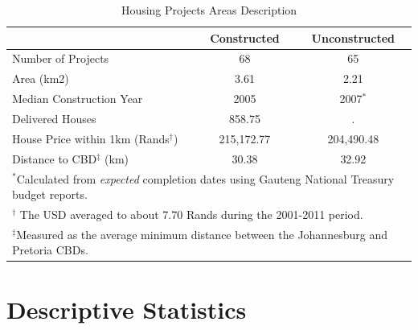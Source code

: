\documentclass[12pt]{article}
\begin{document}
\begin{table}[t!]
\centering
\caption{Housing Projects Areas Description}\label{table:projectdescriptives}
\vspace{-2mm}
\begin{tabular}{l*{1}{cc}}
\toprule
  &Constructed &Unconstructed \\
\midrule
Number of Projects  &       68 &       65 \\
Area (km2) &       3.61 &       2.21  \\
Median Construction Year & 2005 & 2007$^*$\\
Delivered Houses  &     858.75 & .      \\
House Price within 1km (Rands$^\dagger$) &   215,172.77   &   204,490.48   \\
Distance to CBD$^\ddagger$ (km) &  30.38  &     32.92   \\
\bottomrule
\multicolumn{3}{l}{\scriptsize $^*$Calculated from {\it expected} completion dates using Gauteng National Treasury budget reports.}\\[-.5em]
\multicolumn{3}{l}{\scriptsize $^\dagger$ The USD averaged to about 7.70 Rands during the 2001-2011 period.}\\[-.5em]
\multicolumn{3}{l}{\scriptsize $^\ddagger$Measured as the average minimum distance between the Johannesburg and Pretoria CBDs. }
\end{tabular}
\end{table} 

\section{Descriptive Statistics}\label{section:descriptives}


\end{document}
